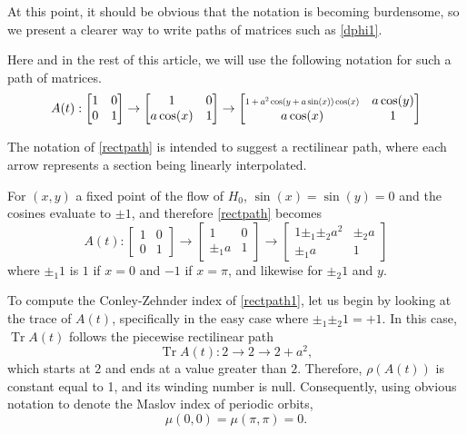\documentclass{article}
\theoremstyle{nonumberplain}
\DeclareMathOperator{\trace}{Tr}
\begin{document}
At this point, it should be obvious that the notation is becoming burdensome, so we present a clearer way to write paths of matrices such as \eqref{dphi1}.

Here and in the rest of this article, we will use the following notation for such a path of matrices.
\begin{equation}\label{rectpath}
A(t) :
\begin{bmatrix}
1 & 0\\
0 & 1
\end{bmatrix}
\to
\begin{bmatrix}
1 & 0\\
a \cos(x) & 1
\end{bmatrix}
\to
\begin{bmatrix}
\scalebox{0.7}{$1+ a^2 \cos(y+a \sin(x)) \cos(x)$} &  a \cos(y)\\
a \cos(x) & 1
\end{bmatrix}
\end{equation}

The notation of \eqref{rectpath} is intended to suggest a rectilinear path, where each arrow represents a section being linearly interpolated.

For $(x,y)$ a fixed point of the flow of $H_0$, $\sin(x) = \sin(y) = 0$ and the cosines evaluate to $\pm 1$, and therefore \ref{rectpath} becomes
\begin{equation}\label{rectpath1}
A(t):
\begin{bmatrix}
1 & 0\\
0 & 1
\end{bmatrix}
\to
\begin{bmatrix}
1 & 0\\
\pm_1 a & 1
\end{bmatrix}
\to
\begin{bmatrix}
1 \pm_1 \pm_2 a^2 &  \pm_2 a\\
\pm_1 a & 1
\end{bmatrix}
\end{equation}
where $\pm_1 1$ is $1$ if $x=0$ and $-1$ if $x = \pi$, and likewise for $\pm_2 1$ and $y$.

To compute the Conley-Zehnder index of \eqref{rectpath1}, let us begin by looking at the trace of $A(t)$, specifically in the easy case where $\pm_1 \pm_2 1 = +1$. In this case, $\trace A(t)$ follows the piecewise rectilinear path
\begin{equation}
\trace A(t) : 2 \to 2 \to 2 + a^2,
\end{equation}
which starts at $2$ and ends at a value greater than $2$. Therefore, $\rho(A(t))$ is constant equal to 1, and its winding number is null. Consequently, using obvious notation to denote the Maslov index of periodic orbits,
\begin{equation}
\mu(0,0) = \mu(\pi,\pi) = 0.
\end{equation}
\end{document}
